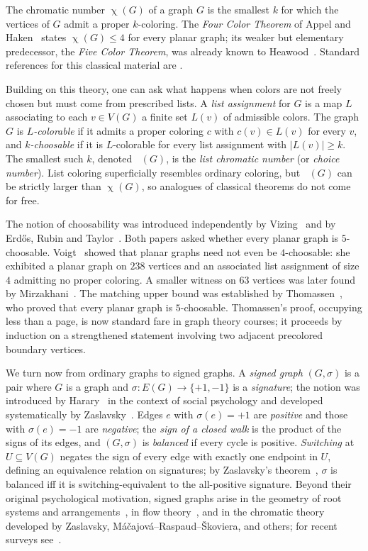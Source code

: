 \documentclass[11pt,a4paper]{article}
\theoremstyle{plain}
\theoremstyle{definition}
\newcommand{\E}{E}
\newcommand{\V}{V}
\DeclareMathOperator{\chia}{\chi}
\DeclareMathOperator{\chil}{\chi_\ell}
\newcommand{\Gs}{(G,\sigma)}
\begin{document}
The chromatic number $\chia(G)$ of a graph $G$ is the smallest $k$
for which the vertices of $G$ admit a proper $k$-coloring. The
\emph{Four Color Theorem} of Appel and
Haken~\cite{AppelHaken1977,RobertsonSST1997} states $\chia(G)\le 4$
for every planar graph; its weaker but elementary predecessor, the
\emph{Five Color Theorem}, was already known to
Heawood~\cite{Heawood1890}. Standard references for this classical
material are \cite{BondyMurty,Diestel,JT}.

Building on this theory, one can ask what happens when colors are
not freely chosen but must come from prescribed lists. A
\emph{list assignment} for $G$ is a map $L$ associating to each
$v\in\V(G)$ a finite set $L(v)$ of admissible colors. The graph
$G$ is \emph{$L$-colorable} if it admits a proper coloring $c$ with
$c(v)\in L(v)$ for every $v$, and \emph{$k$-choosable} if it is
$L$-colorable for every list assignment with $|L(v)|\ge k$. The
smallest such $k$, denoted $\chil(G)$, is the \emph{list chromatic
number} (or \emph{choice number}). List coloring superficially
resembles ordinary coloring, but $\chil(G)$ can be strictly larger
than $\chia(G)$, so analogues of classical theorems do not come for
free.

The notion of choosability was introduced independently by
Vizing~\cite{Vizing1976} and by Erd\H{o}s, Rubin and
Taylor~\cite{ERT1979}. Both papers asked whether every planar graph
is $5$-choosable. Voigt~\cite{Voigt1993} showed that planar graphs
need not even be $4$-choosable: she exhibited a planar graph on
$238$ vertices and an associated list assignment of size $4$
admitting no proper coloring. A smaller witness on $63$ vertices was
later found by Mirzakhani~\cite{Mirzakhani1996}. The matching upper
bound was established by Thomassen~\cite{Thomassen1994}, who proved
that every planar graph is $5$-choosable. Thomassen's proof,
occupying less than a page, is now standard fare in graph theory
courses; it proceeds by induction on a strengthened statement
involving two adjacent precolored boundary vertices.

We turn now from ordinary graphs to signed graphs. A \emph{signed
graph} $\Gs$ is a pair where $G$ is a graph and
$\sigma:\E(G)\to\{+1,-1\}$ is a \emph{signature}; the notion was
introduced by Harary~\cite{Harary1953} in the context of social
psychology and developed systematically by
Zaslavsky~\cite{Zaslavsky1982,Zaslavsky1982b,Zaslavsky1982c}. Edges
$e$ with $\sigma(e)=+1$ are \emph{positive} and those with
$\sigma(e)=-1$ are \emph{negative}; the \emph{sign of a closed walk}
is the product of the signs of its edges, and $\Gs$ is
\emph{balanced} if every cycle is positive. \emph{Switching} at
$U\subseteq\V(G)$ negates the sign of every edge with exactly one
endpoint in $U$, defining an equivalence relation on signatures; by
Zaslavsky's theorem~\cite{Zaslavsky1982}, $\sigma$ is balanced iff
it is switching-equivalent to the all-positive signature. Beyond
their original psychological motivation, signed graphs arise in the
geometry of root systems and
arrangements~\cite{Zaslavsky1982,Zaslavsky1982b}, in flow
theory~\cite{Bouchet1983}, and in the chromatic theory developed by
Zaslavsky, M\'a\v{c}ajov\'a--Raspaud--\v{S}koviera, and others; for
recent surveys see~\cite{NaserasrSY2021,SchweserStiebitzToft2021}.
\end{document}
